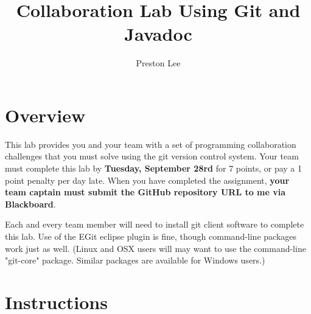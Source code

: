 \documentclass{article}
\author{Preston Lee}
\title{Collaboration Lab Using Git and Javadoc}
\begin{document}

\maketitle

\section{Overview}
This lab provides you and your team with a set of programming collaboration challenges that you must solve using the git version control system.
\footnotemark{} Your team must complete this lab by {\bf Tuesday, September 28rd} for 7 points, or pay a 1 point penalty per day late. When you have completed the assignment, {\bf your team captain must submit the GitHub repository URL to me via Blackboard}.

Each and every team member will need to install git client software to complete this lab. Use of the EGit eclipse plugin is fine, though command-line packages work just as well. (Linux and OSX users will may want to use the command-line "git-core" package. Similar packages are available for Windows users.)

\section{Instructions}
\end{document}
